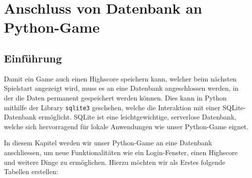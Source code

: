 \lstset{style=Python}
\chapter{Anschluss von Datenbank an Python-Game}
\section{Einführung}

Damit ein Game auch einen Highscore speichern kann, welcher beim nächsten Spielstart angezeigt wird, muss es an eine Datenbank angeschlossen werden, in der die Daten permanent gespeichert werden können. Dies kann in Python mithilfe der Library \lstinline|sqlite3| geschehen, welche die Interaktion mit einer SQLite-Datenbank ermöglicht. SQLite ist eine leichtgewichtige, serverlose Datenbank, welche sich hervorragend für lokale Anwendungen wie unser Python-Game eignet.

In diesem Kapitel werden wir unser Python-Game an eine Datenbank anschliessen, um neue Funktionalitäten wie ein Login-Fenster, einen Highscore und weitere Dinge zu ermöglichen. Hierzu möchten wir als Erstes folgende Tabellen erstellen:


